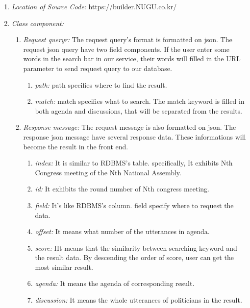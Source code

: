 \documentclass[conference]{IEEEtran}
\begin{document}
\begin{enumerate}
\begin{enumerate}
  	  \end{enumerate}

  \item \textit{Location of Source Code: } https://builder.NUGU.co.kr/\\

  \item \textit{Class component: } 
  	 \begin{enumerate}
	\item \textit {Request queryr: }  The request query’s format is formatted on json. The request json query have two field components. If the user enter some words in the search bar in our service, their words will filled in the URL parameter to send request query to our database.\
	 \begin{enumerate}
	\item \textit {path: }  path specifies where to find the result.\
	\item \textit {match: } match specifies what to search. The match keyword  is filled in both agenda and discussions, that will be separated from the results.\
	\\
	 \end{enumerate}
	 
	 
	\item \textit {Response message: }  The request message is also formatted on json. The response json message have several response data. These informations will become the result in the front end.
	 \begin{enumerate}
	\item \textit {index: }  It is similar to RDBMS’s table. specifically, It exhibits Nth Congress meeting of the Nth National Assembly.\
	\item \textit {id: } It exhibits the round number of Nth congress meeting.\
	\item \textit {field: } It’s like RDBMS’s column. field specify where to request the data.\
	\item \textit {offset: } It means what number of the utterances in agenda.\
	\item \textit {score: } IIt means that the similarity between searching keyword and the result data. By descending the order of score, user can get the most similar result.\
	\item \textit {agenda: }  It means the agenda of corresponding result.\
	\item \textit {discussion: }It means the whole utterances of politicians in the result.\
		\\
	 \end{enumerate}
	 

\end{enumerate}
\end{enumerate}
\end{document}
